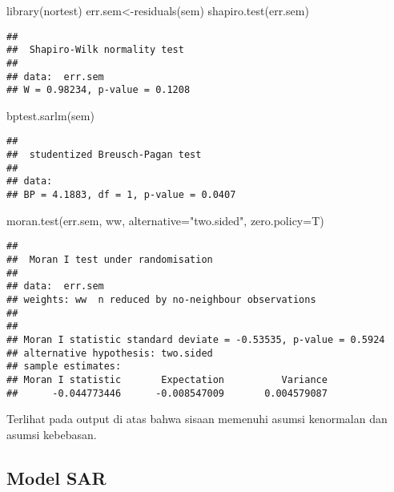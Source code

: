 \documentclass[
]{book}
\newenvironment{Shaded}{\begin{snugshade}}{\end{snugshade}}
\newcommand{\AttributeTok}[1]{\textcolor[rgb]{0.77,0.63,0.00}{#1}}
\newcommand{\FunctionTok}[1]{\textcolor[rgb]{0.00,0.00,0.00}{#1}}
\newcommand{\NormalTok}[1]{#1}
\newcommand{\OtherTok}[1]{\textcolor[rgb]{0.56,0.35,0.01}{#1}}
\newcommand{\StringTok}[1]{\textcolor[rgb]{0.31,0.60,0.02}{#1}}
\begin{document}
\begin{Shaded}
\begin{Highlighting}[]
\FunctionTok{library}\NormalTok{(nortest)}
\NormalTok{err.sem}\OtherTok{\textless{}{-}}\FunctionTok{residuals}\NormalTok{(sem)}
\FunctionTok{shapiro.test}\NormalTok{(err.sem)}
\end{Highlighting}
\end{Shaded}

\begin{verbatim}
## 
##  Shapiro-Wilk normality test
## 
## data:  err.sem
## W = 0.98234, p-value = 0.1208
\end{verbatim}

\begin{Shaded}
\begin{Highlighting}[]
\FunctionTok{bptest.sarlm}\NormalTok{(sem)}
\end{Highlighting}
\end{Shaded}

\begin{verbatim}
## 
##  studentized Breusch-Pagan test
## 
## data:  
## BP = 4.1883, df = 1, p-value = 0.0407
\end{verbatim}

\begin{Shaded}
\begin{Highlighting}[]
\FunctionTok{moran.test}\NormalTok{(err.sem, ww, }\AttributeTok{alternative=}\StringTok{"two.sided"}\NormalTok{, }\AttributeTok{zero.policy=}\NormalTok{T)}
\end{Highlighting}
\end{Shaded}

\begin{verbatim}
## 
##  Moran I test under randomisation
## 
## data:  err.sem  
## weights: ww  n reduced by no-neighbour observations
##   
## 
## Moran I statistic standard deviate = -0.53535, p-value = 0.5924
## alternative hypothesis: two.sided
## sample estimates:
## Moran I statistic       Expectation          Variance 
##      -0.044773446      -0.008547009       0.004579087
\end{verbatim}

Terlihat pada output di atas bahwa sisaan memenuhi asumsi kenormalan dan asumsi kebebasan.

\hypertarget{model-sar}{%
\subsection{Model SAR}\label{model-sar}}
\end{document}
